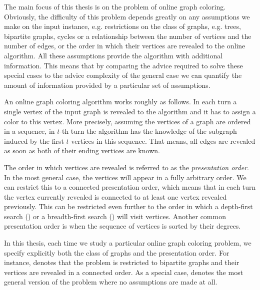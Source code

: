 The main focus of this thesis is on the problem of online graph coloring.
Obviously, the difficulty of this problem depends greatly on any
assumptions we make on the input instance, e.g. restrictions on the class
of graphs, e.g. trees, bipartite graphs, cycles or a relationship between
the number of vertices and the number of edges, or the order in which
their vertices are revealed to the online algorithm. All these assumptions
provide the algorithm with additional information. This means that by
comparing the advice required to solve these special cases to the advice
complexity of the general case we can quantify the amount of information
provided by a particular set of assumptions.

An online graph coloring algorithm works roughly as follows. In each turn
a single vertex of the input graph is revealed to the algorithm and it has
to assign a color to this vertex. More precisely, assuming the vertices of
a graph are ordered in a sequence, in $t$-th turn the algorithm has the
knowledge of the subgraph induced by the first $t$ vertices in this
sequence. That means, all edges are revealed as soon as both of their
ending vertices are known.

The order in which vertices are revealed is referred to as the
\emph{presentation order}. In the most general case, the vertices will
appear in a fully arbitrary order. We can restrict this to a connected
presentation order, which means that in each turn the vertex currently
revealed is connected to at least one vertex revealed previously. This can
be restricted even further to the order in which a depth-first search
() or a breadth-first search () will visit
vertices. Another common presentation order is when the sequence of
vertices is sorted by their degrees.

In this thesis, each time we study a particular online graph coloring
problem, we specify explicitly both the class of graphs and the
presentation order. For instance,  denotes
that the problem is restricted to bipartite graphs and their vertices are
revealed in a connected order. As a special case, 
denotes the most general version of the problem where no assumptions are
made at all.
